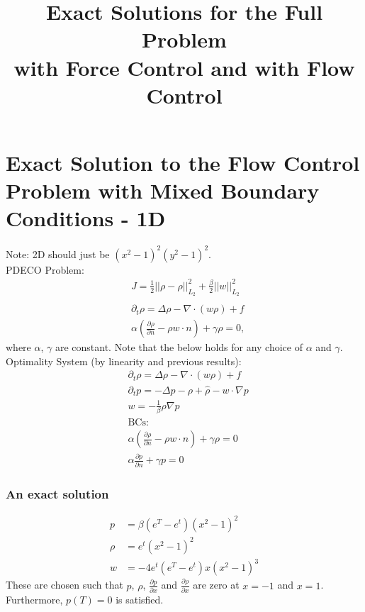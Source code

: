 \documentclass[11pt, a4paper]{article}
\title{Exact Solutions for the Full Problem \\with Force Control and with Flow Control}
\date{}
\theoremstyle{definition}
\begin{document}

\section*{Exact Solution to the Flow Control Problem with Mixed Boundary Conditions - 1D}
Note: 2D should just be $(x^2-1)^2(y^2-1)^2$.\\
PDECO Problem:
\begin{align*}
&J = \frac{1}{2}||\rho - \hat \rho||_{L_2}^2 + \frac{\beta}{2}||w||_{L_2}^2\\
\\
&\partial_t \rho = \Delta \rho - \nabla \cdot (w\rho) + f \\
&\alpha (\frac{\partial \rho}{\partial n} - \rho w \cdot n) + \gamma \rho = 0, 
\end{align*}
where $\alpha$, $\gamma$ are constant. Note that the below holds for any choice of $\alpha$ and $\gamma$.\\

Optimality System (by linearity and previous results):
\begin{align*}
&\partial_t \rho = \Delta \rho - \nabla \cdot (w\rho) + f\\
& \partial_t p = - \Delta p - \rho + \hat \rho - w \cdot \nabla p \\
&w = - \frac{1}{\beta}\rho \nabla p\\
&\text{BCs:}\\
&\alpha (\frac{\partial \rho}{\partial n} - \rho w \cdot n) + \gamma \rho = 0 \\
& \alpha \frac{\partial p }{\partial n} + \gamma p = 0
\end{align*}

\subsubsection*{An exact solution}
\begin{align*}
p &= \beta(e^T - e^t)(x^2 - 1)^2\\
\rho &= e^t(x^2 - 1)^2\\
w &= -4e^t(e^T - e^t)x(x^2 - 1)^3
\end{align*}
These are chosen such that $p$, $\rho$, $\frac{\partial p}{\partial x}$ and $\frac{\partial \rho}{\partial x}$ are zero at $x=-1$ and $x=1$. Furthermore, $p(T) = 0$ is satisfied.
\end{document}
